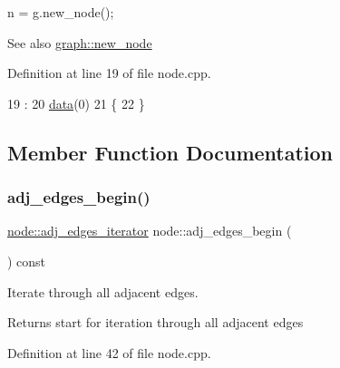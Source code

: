 \begin{DoxyPre}  n = g.new\_node();
\end{DoxyPre}


\begin{DoxySeeAlso}{See also}
\mbox{\hyperlink{classgraph_ab9505335c20558319b6cce25aed23524}{graph\+::new\+\_\+node}} 
\end{DoxySeeAlso}


Definition at line 19 of file node.\+cpp.


\begin{DoxyCode}
19            :
20     \mbox{\hyperlink{classnode_a4ae3d54ebb61be3a102bedf5b91bef75}{data}}(0)
21 \{
22 \}
\end{DoxyCode}


\subsection{Member Function Documentation}
\mbox{\label{classnode_a788d3e932a5c164caa5ec82aa47551b2}} 
\subsubsection{\texorpdfstring{adj\+\_\+edges\+\_\+begin()}{adj\_edges\_begin()}}
{\footnotesize\ttfamily \mbox{\hyperlink{classnode_abdd49248203010f2d5432dfef22d017a}{node\+::adj\+\_\+edges\+\_\+iterator}} node\+::adj\+\_\+edges\+\_\+begin (\begin{DoxyParamCaption}{ }\end{DoxyParamCaption}) const}

Iterate through all adjacent edges.

\begin{DoxyReturn}{Returns}
start for iteration through all adjacent edges 
\end{DoxyReturn}


Definition at line 42 of file node.\+cpp.


